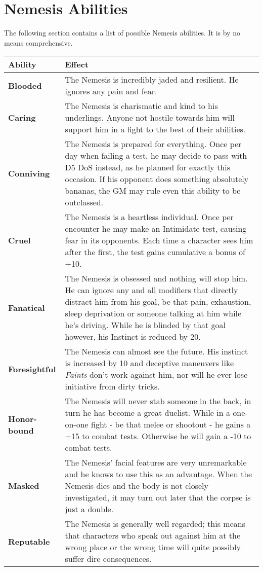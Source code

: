 \documentclass[12pt,a4paper,openany]{book}
\begin{document}
	\section*{Nemesis Abilities}
	The following section contains a list of possible Nemesis abilities. It is by no means comprehensive.
	{\setlength{\extrarowheight}{5pt}
	\begin{tabularx}{\textwidth}{l|X}
		Ability & Effect\\
		\hline
		\textbf{Blooded} & The Nemesis is incredibly jaded and resilient. He ignores any pain and fear.\\
		\hline
		\textbf{Caring} & The Nemesis is charismatic and kind to his underlings. Anyone not hostile towards him will support him in a fight to the best of their abilities.\\
		\hline
		\textbf{Conniving} & The Nemesis is prepared for everything. Once per day when failing a test, he may decide to pass with D5 DoS instead, as he planned for exactly this occasion. If his opponent does something absolutely bananas, the GM may rule even this ability to be outclassed.\\
		\hline
		\textbf{Cruel} & The Nemesis is a heartless individual. Once per encounter he may make an Intimidate test, causing fear in its opponents. Each time a character sees him after the first, the test gains cumulative a bonus of +10.\\
		\hline
		\textbf{Fanatical} & The Nemesis is obsessed and nothing will stop him. He can ignore any and all modifiers that directly distract him from his goal, be that pain, exhaustion, sleep deprivation or someone talking at him while he's driving. While he is blinded by that goal however, his Instinct is reduced by 20.\\
		\hline
		\textbf{Foresightful} & The Nemesis can almost see the future. His instinct is increased by 10 and deceptive maneuvers like \emph{Faints} don't work against him, nor will he ever lose initiative from dirty tricks.\\
		\hline
		\textbf{Honor-bound} & The Nemesis will never stab someone in the back, in turn he has become a great duelist. While in a one-on-one fight - be that melee or shootout - he gains a +15 to combat tests. Otherwise he will gain a -10 to combat tests.\\
		\hline
		\textbf{Masked} & The Nemesis' facial features are very unremarkable and he knows to use this as an advantage. When the Nemesis dies and the body is not closely investigated, it may turn out later that the corpse is just a double.\\
		\hline
		\textbf{Reputable} & The Nemesis is generally well regarded; this means that characters who speak out against him at the wrong place or the wrong time will quite possibly suffer dire consequences.\\
		\hline
		
	\end{tabularx}}
\end{document}
